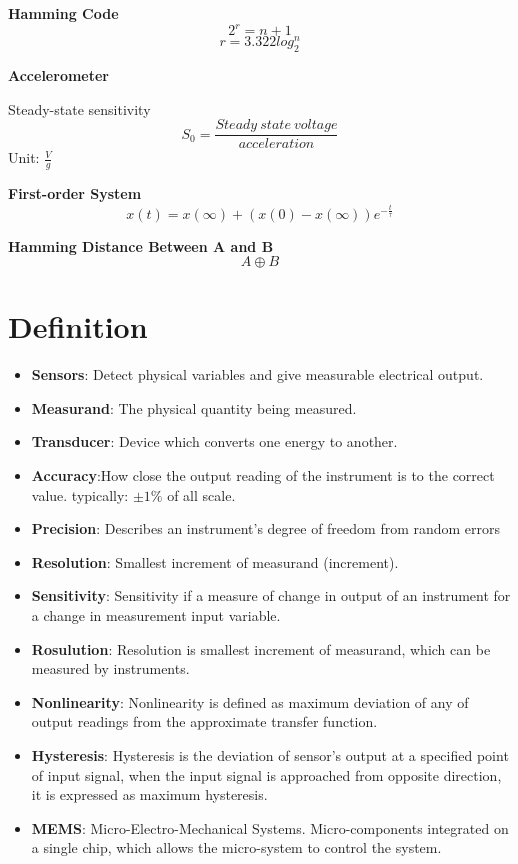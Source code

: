 \documentclass{article}
\begin{document}
	
	\textbf{Hamming Code}
	$$2^r = n+1$$
	$$ r = 3.322log_2^n$$
	
	\textbf{Accelerometer}
	
	Steady-state sensitivity
	$$ S_0 = \frac{Steady\ state \ voltage}{acceleration} $$ 
	Unit: $\frac{V}{g}$
	
	\textbf{First-order System}
	$$x(t) = x(\infty) + (x(0) - x(\infty))e^{-\frac{t}{\tau}}$$
	
	\textbf{Hamming Distance Between A and B}
	$$A \oplus B$$
	
	
	
	\section{Definition}
	\begin{itemize}
		
		\item \textbf{Sensors}: Detect physical variables and give measurable electrical output.
		\item \textbf{Measurand}: The physical quantity being measured.
		\item \textbf{Transducer}: Device which converts one energy to another.
		\item \textbf{Accuracy}:How close the output reading of the instrument is to the correct value.
		typically: $\pm 1\%$ of all scale.
		\item \textbf{Precision}: Describes an instrument’s degree of freedom from random errors
		\item \textbf{Resolution}: Smallest increment of measurand (increment).
		\item \textbf{Sensitivity}: Sensitivity if a measure of change in output of an instrument for a change in measurement input variable.
		\item \textbf{Rosulution}: Resolution is smallest increment of measurand, which can be measured by instruments.
		
		\item \textbf{Nonlinearity}: Nonlinearity is defined as maximum deviation of any of output readings from the approximate transfer function.
		
		\item \textbf{Hysteresis}: Hysteresis is the deviation of sensor's output at a specified point of input signal, when the input signal is approached from opposite direction, it is expressed as maximum hysteresis.
		
		\item \textbf{MEMS}: Micro-Electro-Mechanical Systems. Micro-components integrated on a single chip, which allows the micro-system to control the system.
	\end{itemize}
	
\end{document}
